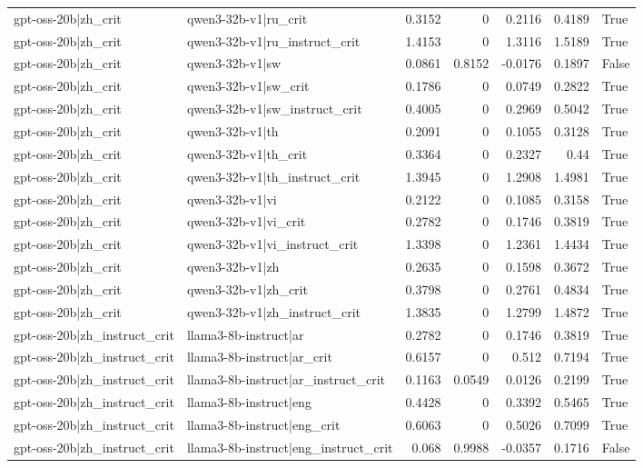\begin{table}
\begin{tabular}{l l r r r r l}
gpt-oss-20b|zh_crit & qwen3-32b-v1|ru_crit & 0.3152 & 0 & 0.2116 & 0.4189 & True \\
gpt-oss-20b|zh_crit & qwen3-32b-v1|ru_instruct_crit & 1.4153 & 0 & 1.3116 & 1.5189 & True \\
gpt-oss-20b|zh_crit & qwen3-32b-v1|sw & 0.0861 & 0.8152 & -0.0176 & 0.1897 & False \\
gpt-oss-20b|zh_crit & qwen3-32b-v1|sw_crit & 0.1786 & 0 & 0.0749 & 0.2822 & True \\
gpt-oss-20b|zh_crit & qwen3-32b-v1|sw_instruct_crit & 0.4005 & 0 & 0.2969 & 0.5042 & True \\
gpt-oss-20b|zh_crit & qwen3-32b-v1|th & 0.2091 & 0 & 0.1055 & 0.3128 & True \\
gpt-oss-20b|zh_crit & qwen3-32b-v1|th_crit & 0.3364 & 0 & 0.2327 & 0.44 & True \\
gpt-oss-20b|zh_crit & qwen3-32b-v1|th_instruct_crit & 1.3945 & 0 & 1.2908 & 1.4981 & True \\
gpt-oss-20b|zh_crit & qwen3-32b-v1|vi & 0.2122 & 0 & 0.1085 & 0.3158 & True \\
gpt-oss-20b|zh_crit & qwen3-32b-v1|vi_crit & 0.2782 & 0 & 0.1746 & 0.3819 & True \\
gpt-oss-20b|zh_crit & qwen3-32b-v1|vi_instruct_crit & 1.3398 & 0 & 1.2361 & 1.4434 & True \\
gpt-oss-20b|zh_crit & qwen3-32b-v1|zh & 0.2635 & 0 & 0.1598 & 0.3672 & True \\
gpt-oss-20b|zh_crit & qwen3-32b-v1|zh_crit & 0.3798 & 0 & 0.2761 & 0.4834 & True \\
gpt-oss-20b|zh_crit & qwen3-32b-v1|zh_instruct_crit & 1.3835 & 0 & 1.2799 & 1.4872 & True \\
gpt-oss-20b|zh_instruct_crit & llama3-8b-instruct|ar & 0.2782 & 0 & 0.1746 & 0.3819 & True \\
gpt-oss-20b|zh_instruct_crit & llama3-8b-instruct|ar_crit & 0.6157 & 0 & 0.512 & 0.7194 & True \\
gpt-oss-20b|zh_instruct_crit & llama3-8b-instruct|ar_instruct_crit & 0.1163 & 0.0549 & 0.0126 & 0.2199 & True \\
gpt-oss-20b|zh_instruct_crit & llama3-8b-instruct|eng & 0.4428 & 0 & 0.3392 & 0.5465 & True \\
gpt-oss-20b|zh_instruct_crit & llama3-8b-instruct|eng_crit & 0.6063 & 0 & 0.5026 & 0.7099 & True \\
gpt-oss-20b|zh_instruct_crit & llama3-8b-instruct|eng_instruct_crit & 0.068 & 0.9988 & -0.0357 & 0.1716 & False \\

\end{tabular}
\end{table}
